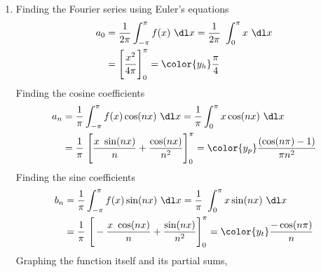 \begin{enumerate}
    \item Finding the Fourier series using Euler's equations
          \begin{align}
              a_0 & = \frac{1}{2\pi} \int_{-\pi}^{\pi} f(x)\ \dl x
              = \frac{1}{2\pi}\ \int_{0}^{\pi} x\ \dl x            \\
                  & = \Bigg[ \frac{x^2}{4\pi} \Bigg]_0^{\pi}
              = \color{y_h} \frac{\pi}{4}
          \end{align}
          Finding the cosine coefficients
          \begin{align}
              a_n & = \frac{1}{\pi} \int_{-\pi}^{\pi} f(x) \cos(nx)\ \dl x
              = \frac{1}{\pi}\int_{0}^{\pi} x \cos(nx)\ \dl x              \\
                  & = \frac{1}{\pi}\ \Bigg[ \frac{x\ \sin(nx)}{n}
                  + \frac{\cos(nx)}{n^2} \Bigg]_0^{\pi}
              = \color{y_p} \frac{(\cos(n\pi) - 1)}{\pi n^2}
          \end{align}
          Finding the sine coefficients
          \begin{align}
              b_n & = \frac{1}{\pi} \int_{-\pi}^{\pi} f(x) \sin(nx)\ \dl x
              = \frac{1}{\pi}\ \int_{0}^{\pi} x \sin(nx)\ \dl x            \\
                  & = \frac{1}{\pi}\ \Bigg[ -\frac{x\ \cos(nx)}{n}
                  + \frac{\sin(nx)}{n^2} \Bigg]_{0}^{\pi}
              = \color{y_t} \frac{-\cos(n\pi)}{n}
          \end{align}
          Graphing the function itself and its partial sums,
          \begin{figure}[H]
              \centering
\end{figure}
\end{enumerate}
